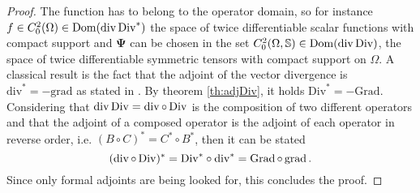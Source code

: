 \begin{theorem}
\begin{proof}
		
		The function has to belong to the operator domain, so for instance $f \in {C}_0^2(\Omega) \in \operatorname{Dom}({\operatorname{div}\operatorname*{Div}}^*)$ the space of twice differentiable scalar functions with compact support and $\bm{\Psi}$ can be chosen in the set ${C}_{0}^2(\Omega, \mathbb{S}) \in \operatorname{Dom}(\operatorname{div}\operatorname*{Div})$, the space of twice differentiable symmetric tensors with compact support on $\Omega$. A classical result is the fact that the adjoint of the vector divergence is $\mathrm{div}^* = -\mathrm{grad}$ as stated in \cite{zwart2015wave}. By theorem \ref{th:adjDiv}, it holds $\mathrm{Div}^* = -\mathrm{Grad}$. Considering that $\operatorname{div}\operatorname*{Div} = \operatorname{div} \circ \operatorname*{Div}$ is the composition of two different operators and that the adjoint of a composed operator is the adjoint of each operator in reverse order, i.e. $(B \circ C)^* = C^* \circ B^*$, then it can be stated
		\begin{equation*}
		(\operatorname{div} \circ \operatorname*{Div})^* = {\operatorname*{Div}}^* \circ {\operatorname{div}}^* = \operatorname*{Grad} \circ \operatorname*{grad}.
		\end{equation*}  
		Since only formal adjoints are being looked for, this concludes the proof.
	\end{proof}
\end{theorem}

